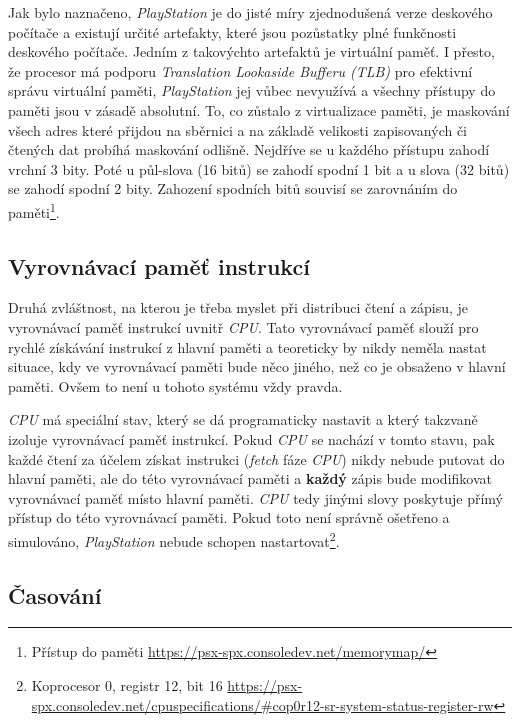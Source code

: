 Jak bylo naznačeno, \textit{PlayStation} je do jisté míry zjednodušená verze 
deskového počítače a existují určité artefakty, které jsou pozůstatky plné funkčnosti deskového počítače. 
Jedním z takovýchto artefaktů je virtuální paměť. I přesto, že procesor má 
podporu \textit{Translation Lookaside Bufferu (TLB)} pro efektivní správu virtuální paměti, \textit{PlayStation} jej vůbec nevyužívá a všechny přístupy do paměti jsou v zásadě absolutní.
To, co zůstalo z virtualizace paměti, je maskování všech adres které přijdou na sběrnici a na základě velikosti zapisovaných či čtených dat probíhá maskování odlišně.
Nejdříve se u každého přístupu zahodí vrchní 3 bity. 
Poté u půl-slova (16 bitů) se zahodí spodní 1 bit a u slova (32 bitů) se zahodí spodní 2 bity. 
Zahození spodních bitů souvisí se zarovnáním do paměti\footnote{Přístup do paměti\cite{PSXSpec} \url{https://psx-spx.consoledev.net/memorymap/}}.

\subsection{Vyrovnávací paměť instrukcí}

Druhá zvláštnost, na kterou je třeba myslet při distribuci čtení a zápisu, je vyrovnávací paměť instrukcí uvnitř \textit{CPU}. 
Tato vyrovnávací paměť slouží pro rychlé získávání instrukcí z hlavní paměti a teoreticky by nikdy 
neměla nastat situace, kdy ve vyrovnávací paměti bude něco jiného, než co je obsaženo v hlavní paměti. 
Ovšem to není u tohoto systému vždy pravda.

\textit{CPU} má speciální stav, který se dá programaticky nastavit a který takzvaně izoluje vyrovnávací paměť instrukcí. 
Pokud \textit{CPU} se nachází v tomto stavu, pak každé čtení za účelem získat instrukci (\textit{fetch} fáze \textit{CPU}) 
nikdy nebude putovat do hlavní paměti, ale do této vyrovnávací paměti a \textbf{každý} zápis bude modifikovat vyrovnávací paměť místo hlavní paměti. 
\textit{CPU} tedy jinými slovy poskytuje přímý přístup do této vyrovnávací paměti.
Pokud toto není správně ošetřeno a simulováno, \textit{PlayStation} nebude schopen nastartovat\footnote{Koprocesor 0, registr 12, bit 16\cite{PSXSpec} \url{https://psx-spx.consoledev.net/cpuspecifications/\#cop0r12-sr-system-status-register-rw}}.

\subsection{Časování}

